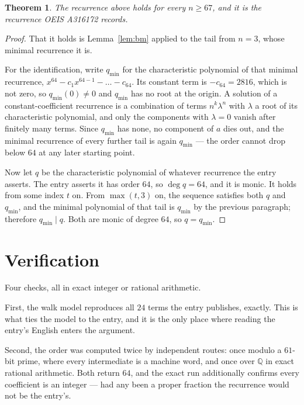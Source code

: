 \documentclass[11pt,a4paper]{article}
\theoremstyle{plain}
\newtheorem{theorem}{Theorem}
\theoremstyle{definition}
\begin{document}
\begin{theorem}
The recurrence above holds for every $n\ge67$, and it is the recurrence OEIS A316172 records.
\end{theorem}

\begin{proof}
That it holds is Lemma~\ref{lem:bm} applied to the tail from $n=3$, whose minimal
recurrence it is.

For the identification, write $q_{\min}$ for the characteristic polynomial of that minimal
recurrence, $x^{64}-c_1x^{64-1}-\dots-c_{64}$. Its constant term is
$-c_{64}=2816$, which is not zero, so $q_{\min}(0)\neq0$ and $q_{\min}$ has no
root at the origin. A solution of a constant-coefficient recurrence is a combination of terms
$n^{k}\lambda^{n}$ with $\lambda$ a root of its characteristic polynomial, and only the
components with $\lambda=0$ vanish after finitely many terms. Since $q_{\min}$ has none, no
component of $a$ dies out, and the minimal recurrence of every further tail is again
$q_{\min}$ --- the order cannot drop below $64$ at any later starting point.

Now let $q$ be the characteristic polynomial of whatever recurrence the entry asserts. The
entry asserts it has order $64$, so $\deg q=64$, and it is monic. It holds from some
index $t$ on. From $\max(t,3)$ on, the sequence satisfies both $q$ and $q_{\min}$, and
the minimal polynomial of that tail is $q_{\min}$ by the previous paragraph; therefore
$q_{\min}\mid q$. Both are monic of degree $64$, so $q=q_{\min}$.
\end{proof}

\section{Verification}

Four checks, all in exact integer or rational arithmetic.

First, the walk model reproduces all $24$ terms the entry publishes, exactly. This is
what ties the model to the entry, and it is the only place where reading the entry's English
enters the argument.

Second, the order was computed twice by independent routes: once modulo a $61$-bit prime, where
every intermediate is a machine word, and once over $\mathbb{Q}$ in exact rational arithmetic.
Both return $64$, and the exact run additionally confirms every coefficient is an integer
--- had any been a proper fraction the recurrence would not be the entry's.
\end{document}
